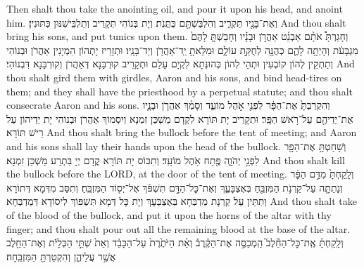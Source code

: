{{Then shalt thou take the anointing oil, and pour it upon his head, and anoint him.}{}
{וְאֶת־בָּנָ֖יו תַּקְרִ֑יב וְהִלְבַּשְׁתָּ֖ם כֻּתֳּנֹֽת׃}
{וְיָת בְּנוֹהִי תְּקָרֵיב וְתַלְבֵּישִׁנּוּן כִּתּוּנִין׃}
{And thou shalt bring his sons, and put tunics upon them.}{}
{וְחָגַרְתָּ֩ אֹתָ֨ם אַבְנֵ֜ט אַהֲרֹ֣ן וּבָנָ֗יו וְחָבַשְׁתָּ֤ לָהֶם֙ מִגְבָּעֹ֔ת וְהָיְתָ֥ה לָהֶ֛ם כְּהֻנָּ֖ה לְחֻקַּ֣ת עוֹלָ֑ם וּמִלֵּאתָ֥ יַֽד־אַהֲרֹ֖ן וְיַד־בָּנָֽיו׃
}
{וּתְזָרֵיז יָתְהוֹן הִמְיָנִין אַהֲרֹן וּבְנוֹהִי וְתַתְקֵין לְהוֹן קוֹבְעִין וּתְהֵי לְהוֹן כְּהוּנְּתָא לִקְיָם עָלַם וּתְקָרֵיב קוּרְבָּנָא דְּאַהֲרֹן וְקוּרְבָּנָא דִּבְנוֹהִי׃}
{And thou shalt gird them with girdles, Aaron and his sons, and bind head-tires on them; and they shall have the priesthood by a perpetual statute; and thou shalt consecrate Aaron and his sons.}{}
{וְהִקְרַבְתָּ֙ אֶת־הַפָּ֔ר לִפְנֵ֖י אֹ֣הֶל מוֹעֵ֑ד וְסָמַ֨ךְ אַהֲרֹ֧ן וּבָנָ֛יו אֶת־יְדֵיהֶ֖ם עַל־רֹ֥אשׁ הַפָּֽר׃}
{וּתְקָרֵיב יָת תּוֹרָא לִקְדָם מַשְׁכַּן זִמְנָא וְיִסְמוֹךְ אַהֲרֹן וּבְנוֹהִי יָת יְדֵיהוֹן עַל רֵישׁ תּוֹרָא׃}
{And thou shalt bring the bullock before the tent of meeting; and Aaron and his sons shall lay their hands upon the head of the bullock.}{}
{וְשָׁחַטְתָּ֥ אֶת־הַפָּ֖ר לִפְנֵ֣י יְהֹוָ֑ה פֶּ֖תַח אֹ֥הֶל מוֹעֵֽד׃
}
{וְתִכּוֹס יָת תּוֹרָא קֳדָם יְיָ בִּתְרַע מַשְׁכַּן זִמְנָא׃}
{And thou shalt kill the bullock before the LORD, at the door of the tent of meeting.}{}
{וְלָֽקַחְתָּ֙ מִדַּ֣ם הַפָּ֔ר וְנָתַתָּ֛ה עַל־קַרְנֹ֥ת הַמִּזְבֵּ֖חַ בְּאֶצְבָּעֶ֑ךָ וְאֶת־כׇּל־הַדָּ֣ם תִּשְׁפֹּ֔ךְ אֶל־יְס֖וֹד הַמִּזְבֵּֽחַ׃
}
{וְתִסַּב מִדְּמָא דְּתוֹרָא וְתִתֵּין עַל קַרְנָת מַדְבְּחָא בְּאֶצְבְּעָךְ וְיָת כָּל דְּמָא תִּשְׁפּוֹךְ לִיסוֹדָא דְּמַדְבְּחָא׃}
{And thou shalt take of the blood of the bullock, and put it upon the horns of the altar with thy finger; and thou shalt pour out all the remaining blood at the base of the altar.}{}
{וְלָֽקַחְתָּ֗ אֶֽת־כׇּל־הַחֵ֘לֶב֮ הַֽמְכַסֶּ֣ה אֶת־הַקֶּ֒רֶב֒ וְאֵ֗ת הַיֹּתֶ֙רֶת֙ עַל־הַכָּבֵ֔ד וְאֵת֙ שְׁתֵּ֣י הַכְּלָיֹ֔ת וְאֶת־הַחֵ֖לֶב אֲשֶׁ֣ר עֲלֵיהֶ֑ן וְהִקְטַרְתָּ֖ הַמִּזְבֵּֽחָה׃
}}
